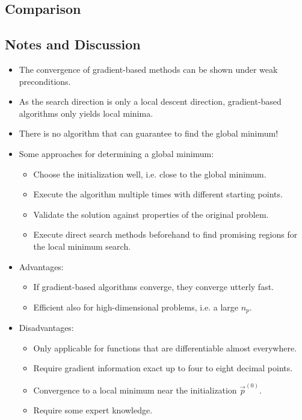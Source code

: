 		\subsection{Comparison} %

		\subsection{Notes and Discussion}
			\begin{itemize}
				\item The convergence of gradient-based methods can be shown under weak preconditions.
				\item As the search direction is only a local descent direction, gradient-based algorithms only yields local minima.
				\item There is no algorithm that can guarantee to find the global minimum!
				\item Some approaches for determining a global minimum:
					\begin{itemize}
						\item Choose the initialization well, i.e. close to the global minimum.
						\item Execute the algorithm multiple times with different starting points.
						\item Validate the solution against properties of the original problem.
						\item Execute direct search methods beforehand to find promising regions for the local minimum search.
					\end{itemize}
			\end{itemize}

			\begin{itemize}
				\item Advantages:
					\begin{itemize}
						\item If gradient-based algorithms converge, they converge utterly fast.
						\item Efficient also for high-dimensional problems, i.e. a large \( n_p \).
					\end{itemize}
				\item Disadvantages:
					\begin{itemize}
						\item Only applicable for functions that are differentiable almost everywhere.
						\item Require gradient information exact up to four to eight decimal points.
						\item Convergence to a local minimum near the initialization \( \vec{p}^{(0)} \).
						\item Require some expert knowledge.
					\end{itemize}
			\end{itemize}


